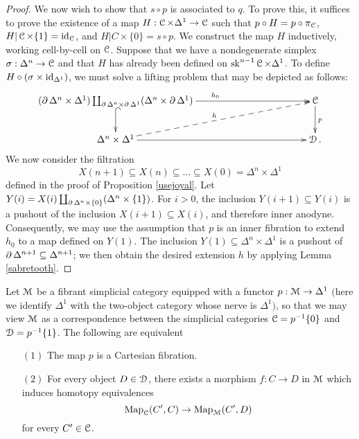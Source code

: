 \begin{proof}
We now wish to show that $s \circ p$ is associated to $q$. To prove this, it suffices to prove the existence of a map $H: \operatorname{\mathcal{C}} \times \Delta^1 \rightarrow \operatorname{\mathcal{C}}$ such that
$p \circ H = p \circ \pi_{\operatorname{\mathcal{C}}}$, $H | \operatorname{\mathcal{C}} \times \{1\} = \operatorname{id}_{\operatorname{\mathcal{C}}}$, and $H| C \times \{0\} = s \circ p$. We construct the map $H$ inductively, working cell-by-cell on $\operatorname{\mathcal{C}}$. Suppose that we have a nondegenerate simplex $\sigma: \Delta^n \rightarrow \operatorname{\mathcal{C}}$ and that $H$ has already been defined on $\operatorname{sk}^{n-1} \operatorname{\mathcal{C}} \times \Delta^1$. To define $H \circ (\sigma \times \operatorname{id}_{\Delta^1})$, we must solve a lifting problem that may be depicted as follows:
$$ \xymatrix{ (\bd \Delta^n \times \Delta^1) \coprod_{ \bd \Delta^n \times \bd \Delta^1} (\Delta^n \times \bd \Delta^1) \ar[rrrr]^{h_0} \ar@{^{(}->}[d] & & & & \calC \ar[d]^{p} \\
\Delta^n \times \Delta^1 \ar[rrrr] \ar@{-->}[urrrr]^{h} & & & & \calD.}$$
We now consider the filtration
$$ X(n+1) \subseteq X(n) \subseteq \ldots \subseteq X(0) = \Delta^n \times \Delta^1$$
defined in the proof of Proposition \ref{usejoyal}. Let $Y(i) = X(i) \coprod_{ \operatorname{\partial} \Delta^n \times \{0\} } (\Delta^n \times \{1\})$. For $i > 0$, the inclusion $Y(i+1) \subseteq Y(i)$ is a pushout of the inclusion $X(i+1) \subseteq X(i)$, and therefore inner anodyne. Consequently, we may use the assumption that $p$ is an inner fibration to extend $h_0$ to a map defined on $Y(1)$. The
inclusion $Y(1) \subseteq \Delta^n \times \Delta^1$ is a pushout of $\operatorname{\partial} \Delta^{n+1} \subseteq \Delta^{n+1}$; we then obtain the desired extension $h$ by applying Lemma \ref{sabretooth}.
\end{proof}

\begin{proposition}\label{simpex}
Let $\operatorname{\mathcal{M}}$ be a fibrant simplicial category equipped with a functor $p: \operatorname{\mathcal{M}} \rightarrow \Delta^1$ $($here we identify $\Delta^1$ with the two-object category whose nerve is $\Delta^1${}$)$, so that we may view $\operatorname{\mathcal{M}}$ as a correspondence between the simplicial categories $\operatorname{\mathcal{C}} = p^{-1} \{0\}$ and
$\operatorname{\mathcal{D}} = p^{-1} \{1\}$. The following are equivalent
\begin{itemize}
\item[$(1)$] The map $p$ is a Cartesian fibration.
\item[$(2)$] For every object $D \in \operatorname{\mathcal{D}}$, there exists a morphism $f: C \rightarrow D$ in $\operatorname{\mathcal{M}}$
which induces homotopy equivalences
$$ \operatorname{{Map}}_{\operatorname{\mathcal{C}}}(C',C) \rightarrow \operatorname{{Map}}_{\operatorname{\mathcal{M}}}(C',D)$$
for every $C' \in \operatorname{\mathcal{C}}$.
\end{itemize}
\end{proposition}

